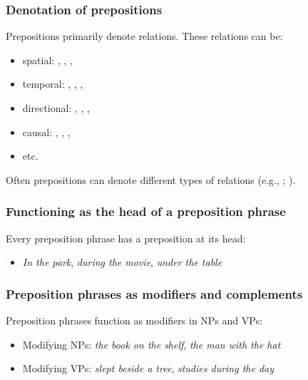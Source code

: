 \subsubsection*{Denotation of prepositions}

Prepositions primarily denote relations. These relations can be:

\begin{itemize}[noitemsep]
   \item spatial: , , , 
   \item temporal: , , , 
   \item directional: , , , 
   \item causal: , , ,
   \item etc.
\end{itemize}

\noindent Often prepositions can denote different types of relations (e.g., ; ).

\subsubsection*{Functioning as the head of a preposition phrase}

Every preposition phrase has a preposition at its head:

\begin{itemize}[noitemsep]
   \item \textit{\emph{In} the park}, \textit{\emph{during} the movie}, \textit{\emph{under} the table}
\end{itemize}

\subsubsection*{Preposition phrases as modifiers and complements}

Preposition phrases function as modifiers in NPs and VPs:

\begin{itemize}[noitemsep]
   \item Modifying NPs: \textit{the book \emph{on the shelf}}, \textit{the man \emph{with the hat}}
   \item Modifying VPs: \textit{slept \emph{beside a tree}}, \textit{studies \emph{during the day}}
\end{itemize}

